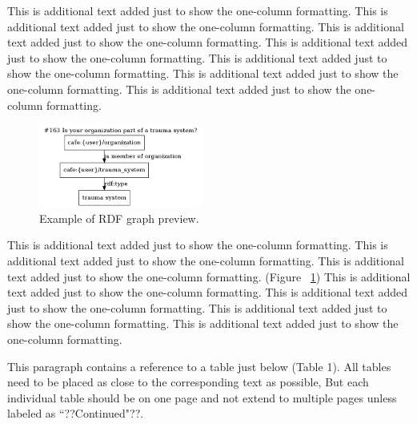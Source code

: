 \documentclass{amia}
\begin{document}
This is additional text added just to show the one-column formatting.  This is additional text added just to show the one-column formatting.  This is additional text added just to show the one-column formatting.  This is additional text added just to show the one-column formatting.  This is additional text added just to show the one-column formatting.  This is additional text added just to show the one-column formatting.  This is additional text added just to show the one-column formatting.

\pagebreak

\begin{figure}
  \begin{center}
    \includegraphics[width=0.48\textwidth]{pics/163.png}
  \end{center}
  \caption{Example of RDF graph preview.}
  \label{rdf_example}
\end{figure}

This is additional text added just to show the one-column formatting.  This is additional text added just to show the one-column formatting.  This is additional text added just to show the one-column formatting. (Figure ~\ref{rdf_example})  This is additional text added just to show the one-column formatting.  This is additional text added just to show the one-column formatting.  This is additional text added just to show the one-column formatting.  This is additional text added just to show the one-column formatting.

This paragraph contains a reference to a table just below (Table 1).  All tables need to be placed as close to the corresponding text as possible, But each individual table should be on one page and not extend to multiple pages unless labeled as ``??Continued"??.
\end{document}
